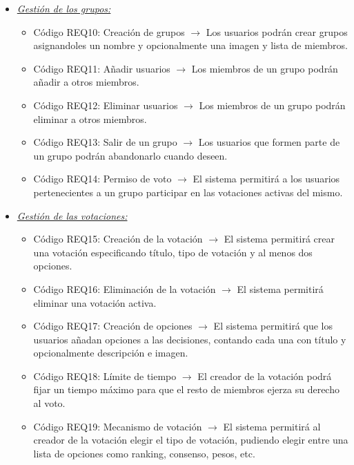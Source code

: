 \begin{itemize}
\begin{itemize}
          \item Código REQ9: Gestión de datos $\rightarrow$ El administrador podrá modificar o eliminar la información almacenada en el sistema.
        \end{itemize}
    \item \textit{\uline{Gestión de los grupos:}} 
        \begin{itemize}
            \item Código REQ10: Creación de grupos $\rightarrow$ Los usuarios podrán crear grupos asignandoles un nombre y opcionalmente una imagen y lista de miembros.
            \item Código REQ11: Añadir usuarios $\rightarrow$ Los miembros de un grupo podrán añadir a otros miembros.  
            \item Código REQ12: Eliminar usuarios $\rightarrow$ Los miembros de un grupo podrán eliminar a otros miembros.
            \item Código REQ13: Salir de un grupo $\rightarrow$ Los usuarios que formen parte de un grupo podrán abandonarlo cuando deseen.
            \item Código REQ14: Permiso de voto $\rightarrow$ El sistema permitirá a los usuarios pertenecientes a un grupo participar en las votaciones activas del mismo.
        \end{itemize}  
    \item \textit{\uline{Gestión de las votaciones:}} 
        \begin{itemize}
          \item Código REQ15: Creación de la votación $\rightarrow$ El sistema permitirá crear una votación especificando título, tipo de votación y al menos dos opciones.
          \item Código REQ16: Eliminación de la votación $\rightarrow$ El sistema permitirá eliminar una votación activa.
          \item Código REQ17: Creación de opciones $\rightarrow$ El sistema permitirá que los usuarios añadan opciones a las decisiones, contando cada una con título y opcionalmente descripción e imagen.
          \item Código REQ18: Límite de tiempo $\rightarrow$ El creador de la votación podrá fijar un tiempo máximo para que el resto de miembros ejerza su derecho al voto.
          \item Código REQ19: Mecanismo de votación $\rightarrow$ El sistema permitirá al creador de la votación elegir el tipo de votación, pudiendo elegir entre una lista de opciones como ranking, consenso, pesos, etc.

\end{itemize}
\end{itemize}
